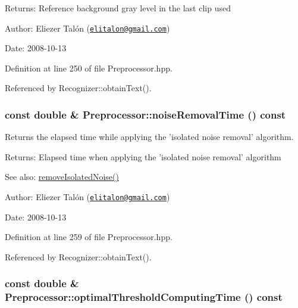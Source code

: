 \begin{Desc}
\item[Returns:]Reference background gray level in the last clip used\end{Desc}
\begin{Desc}
\item[Author:]Eliezer Talón (\href{mailto:elitalon@gmail.com}{\tt elitalon@gmail.com}) \end{Desc}
\begin{Desc}
\item[Date:]2008-10-13 \end{Desc}


Definition at line 250 of file Preprocessor.hpp.

Referenced by Recognizer::obtainText().\hypertarget{class_preprocessor_e54e2a5703a0f39ddff8e9936f9a2275}{
\subsubsection[noiseRemovalTime]{\setlength{\rightskip}{0pt plus 5cm}const double \& Preprocessor::noiseRemovalTime () const}}
\label{class_preprocessor_e54e2a5703a0f39ddff8e9936f9a2275}


Returns the elapsed time while applying the 'isolated noise removal' algorithm. 

\begin{Desc}
\item[Returns:]Elapsed time when applying the 'isolated noise removal' algorithm\end{Desc}
\begin{Desc}
\item[See also:]\hyperlink{class_preprocessor_a3e047486a0a80f2103f51d7141e41c5}{removeIsolatedNoise()}\end{Desc}
\begin{Desc}
\item[Author:]Eliezer Talón (\href{mailto:elitalon@gmail.com}{\tt elitalon@gmail.com}) \end{Desc}
\begin{Desc}
\item[Date:]2008-10-13 \end{Desc}


Definition at line 259 of file Preprocessor.hpp.

Referenced by Recognizer::obtainText().\hypertarget{class_preprocessor_2bd63a7e7aba300ddf79b2c956e943e9}{
\subsubsection[optimalThresholdComputingTime]{\setlength{\rightskip}{0pt plus 5cm}const double \& Preprocessor::optimalThresholdComputingTime () const}}
\label{class_preprocessor_2bd63a7e7aba300ddf79b2c956e943e9}



